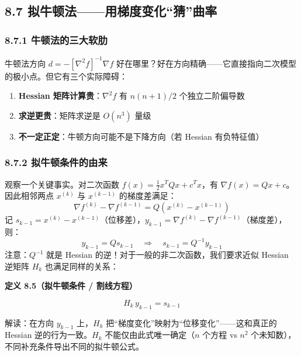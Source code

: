 \medskip
{}
\medskip

\subsection{8.7 拟牛顿法——用梯度变化“猜”曲率}

\subsubsection{8.7.1 牛顿法的三大软肋}

牛顿法方向 $d = -[\nabla^2 f]^{-1}\nabla f$ 好在哪里？好在方向精确——它直接指向二次模型的极小点。但它有三个实际障碍：
\begin{enumerate}
  \item \textbf{Hessian 矩阵计算贵}：$\nabla^2 f$ 有 $n(n+1)/2$ 个独立二阶偏导数
  \item \textbf{求逆更贵}：矩阵求逆是 $O(n^3)$ 量级
  \item \textbf{不一定正定}：牛顿方向可能不是下降方向（若 Hessian 有负特征值）
\end{enumerate}


\subsubsection{8.7.2 拟牛顿条件的由来}

观察一个关键事实。对二次函数 $f(x) = \tfrac{1}{2}x^T Q x + c^T x$，有 $\nabla f(x) = Qx + c$。因此相邻两点 $x^{(k)}$ 与 $x^{(k-1)}$ 的梯度差满足：
\[
\nabla f^{(k)} - \nabla f^{(k-1)} = Q(x^{(k)} - x^{(k-1)})
\]
记 $s_{k-1} = x^{(k)} - x^{(k-1)}$（位移差），$y_{k-1} = \nabla f^{(k)} - \nabla f^{(k-1)}$（梯度差），则：
\[
y_{k-1} = Q s_{k-1}\quad\Longrightarrow\quad s_{k-1} = Q^{-1} y_{k-1}
\]
注意：$Q^{-1}$ 就是 Hessian 的逆！对于一般的非二次函数，我们要求近似 Hessian 逆矩阵 $H_k$ 也满足同样的关系：

\begin{defbox}
\textbf{定义 8.5（拟牛顿条件 / 割线方程）}

\[
H_k\, y_{k-1} = s_{k-1}
\]

解读：在方向 $y_{k-1}$ 上，$H_k$ 把``梯度变化''映射为``位移变化''——这和真正的 Hessian 逆的行为一致。$H_k$ 不能仅由此式唯一确定（$n$ 个方程 vs $n^2$ 个未知数），不同补充条件导出不同的拟牛顿公式。
\end{defbox}

